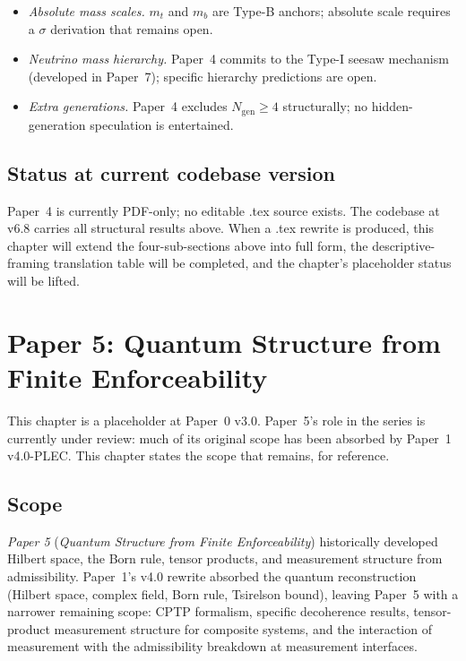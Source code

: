 \documentclass[11pt]{article}
\newcommand{\paperref}[2]{\emph{Paper #1} (\emph{#2})}
\begin{document}
\begin{itemize}
    \item \emph{Absolute mass scales.} $m_t$ and $m_b$ are Type-B anchors; absolute scale requires a $\sigma$ derivation that remains open.
    \item \emph{Neutrino mass hierarchy.} Paper~4 commits to the Type-I seesaw mechanism (developed in Paper~7); specific hierarchy predictions are open.
    \item \emph{Extra generations.} Paper~4 excludes $N_{\mathrm{gen}} \geq 4$ structurally; no hidden-generation speculation is entertained.
\end{itemize}

\subsection{Status at current codebase version}\label{sec:P4_status}

Paper~4 is currently PDF-only; no editable .tex source exists. The codebase at v6.8 carries all structural results above. When a .tex rewrite is produced, this chapter will extend the four-sub-sections above into full form, the descriptive-framing translation table will be completed, and the chapter's placeholder status will be lifted.

\clearpage

\section{Paper 5: Quantum Structure from Finite Enforceability}\label{sec:P5}

\begin{tcolorbox}[pendingbox, title={Status: placeholder chapter}]
This chapter is a placeholder at Paper~0 v3.0. Paper~5's role in the series is currently under review: much of its original scope has been absorbed by Paper~1 v4.0-PLEC. This chapter states the scope that remains, for reference.
\end{tcolorbox}

\subsection{Scope}\label{sec:P5_scope}

\paperref{5}{Quantum Structure from Finite Enforceability} historically developed Hilbert space, the Born rule, tensor products, and measurement structure from admissibility. Paper~1's v4.0 rewrite absorbed the quantum reconstruction (Hilbert space, complex field, Born rule, Tsirelson bound), leaving Paper~5 with a narrower remaining scope: CPTP formalism, specific decoherence results, tensor-product measurement structure for composite systems, and the interaction of measurement with the admissibility breakdown at measurement interfaces.
\end{document}

